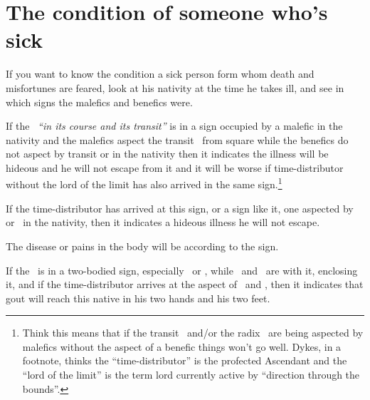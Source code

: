 \section{The condition of someone who's sick}
If you want to know the condition a sick person form whom death and misfortunes are feared, look at his nativity at the time he takes ill, and see in which signs the malefics and benefics were. 

If the \Moon\, \textsl{``in its course and its transit''} is in a sign occupied by a malefic in the nativity and the malefics aspect the transit \Moon\,  from square while the benefics do not aspect by transit or in the nativity then it indicates the illness will be hideous and he will not escape from it and it will be worse if time-distributor without the lord of the limit has also arrived in the same sign.\footnote{Think this means that if the transit \Moon\, and/or the radix \Moon\, are being aspected by malefics without the aspect of a benefic things won't go well. Dykes, in a footnote, thinks the ``time-distributor'' is the profected Ascendant and the ``lord of the limit'' is the term lord currently active by ``direction through the bounds''.}

If the time-distributor has arrived at this sign, or a sign like it, one aspected by \Saturn\, or \Mars\, in the nativity, then it indicates a hideous illness he will not escape.

The disease or pains in the body will be according to the sign.

If the \Moon\, is in a two-bodied sign, especially \Gemini\, or \Pisces, while \Saturn\, and \Mars\, are with it, enclosing it, and if the time-distributor arrives at the aspect of \Saturn\, and \Mars, then it indicates that gout will reach this native in his two hands and his two feet.
